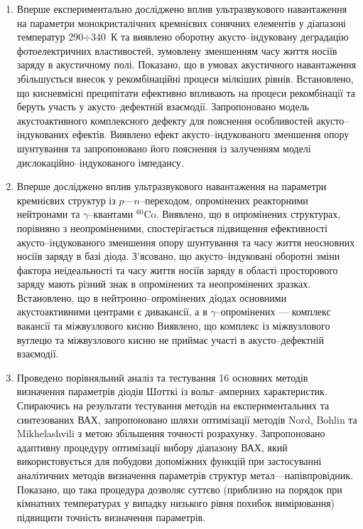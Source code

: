 \begin{enumerate}[leftmargin=0cm,itemindent=3em]
  \item Вперше експериментально досліджено вплив ультразвукового навантаження на параметри монокристалічних кремнієвих сонячних елементів у діапазоні температур 290$\div$340~К
  та виявлено оборотну акусто--індуковану деградацію фотоелектричних властивостей, зумовлену зменшенням часу життя носіїв заряду в акустичному полі.
  Показано, що в умовах акустичного навантаження збільшується внесок у рекомбінаційні процеси мілкіших рівнів.
  Встановлено, що кисневмісні преципітати ефективно впливають на процеси рекомбінації та беруть участь у акусто--дефектній взаємодії.
  Запропоновано модель акустоактивного комплексного дефекту для пояснення особливостей акусто--індукованих ефектів.
 Виявлено ефект акусто--індукованого зменшення  опору шунтування та запропоновано його пояснення із залученням моделі дислокаційно--індукованого імпедансу.

\item Вперше досліджено вплив ультразвукового навантаження на параметри кремнієвих структур із $p$---$n$--переходом, опромінених реакторними нейтронами та $\gamma$--квантами $^{60}$Co.
      Виявлено, що в опромінених структурах, порівняно з неопроміненими, спостерігається підвищення ефективності акусто--індукованого зменшення  опору шунтування та часу життя неосновних носіїв заряду в базі діода.
      З'ясовано, що акусто--індуковані оборотні зміни фактора неідеальності та часу життя носіїв заряду в області просторового заряду   мають різний знак в опромінених та неопромінених зразках.
      Встановлено, що в нейтронно--опромінених діодах основними акустоактивними центрами є дивакансії,
      а в $\gamma$--опромінених --- комплекс вакансії та міжвузлового кисню
     Виявлено, що комплекс із міжвузлового вуглецю та міжвузлового кисню не приймає участі в акусто--дефектній взаємодії.

\item  Проведено порівняльний аналіз та тестування 16 основних методів визначення параметрів діодів Шотткі із вольт--амперних характеристик.
         Спираючись на результати тестування методів на експериментальних та синтезованих  ВАХ,
         запропоновано шляхи оптимізації методів Nord, Bohlin та Mikhelashvili з метою збільшення точності розрахунку.
      Запропоновано адаптивну процедуру оптимізації вибору діапазону ВАХ, який використовується для побудови допоміжних функцій при застосуванні аналітичних методів визначення параметрів структур метал---напівпровідник.
       Показано, що така процедура дозволяє суттєво (приблизно на порядок при кімнатних температурах у випадку низького рівня похибок вимірювання) підвищити точність визначення параметрів.


\end{enumerate}
